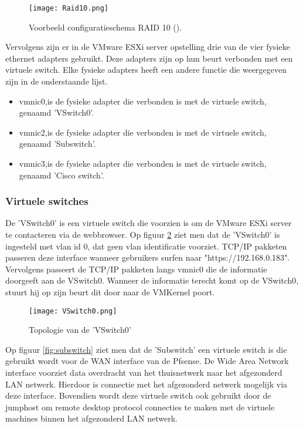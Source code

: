 \begin{figure}[H]
	\centering
	\texttt{[image: Raid10.png]}
	\caption{Voorbeeld configuratieschema RAID 10 (\cite{Raid10}).}
	\label{fig:Raid10}
\end{figure}

Vervolgens zijn er in de VMware ESXi server opstelling drie van de vier fysieke ethernet adapters gebruikt. Deze adapters zijn op hun beurt verbonden met een virtuele switch. Elke fysieke adapters heeft een andere functie die weergegeven zijn in de onderstaande lijst. 


\begin{itemize}
	\item vmnic0,is de fysieke adapter die verbonden is met de virtuele switch, genaamd 'VSwitch0'.
	\item vmnic2,is de fysieke adapter die verbonden is met de virtuele switch, genaamd 'Sub\textunderscore switch'.
	\item vmnic3,is de fysieke adapter die verbonden is met de virtuele switch, genaamd 'Cisco \textunderscore switch'.
\end{itemize}

\newpage
\subsubsection{Virtuele switches}
\newline
De 'VSwitch0' is een virtuele switch die voorzien is om de VMware ESXi server te contacteren via de webbrowser. Op figuur \ref{fig:Vswitch0} ziet men dat de 'VSwitch0' is ingesteld met vlan id 0, dat geen vlan identificatie voorziet. 
\newline
\newline
TCP/IP pakketen passeren deze interface wanneer gebruikers surfen naar "https://192.168.0.183". Vervolgens passeert de TCP/IP pakketen langs vmnic0 die de informatie doorgeeft aan de VSwitch0. Wanneer de informatie terecht komt op de VSwitch0, stuurt hij op zijn beurt dit door naar de VMKernel poort.


\begin{figure}[H]
	\centering
	\texttt{[image: VSwitch0.png]}
	\caption{Topologie van de 'VSwitch0'}
	\label{fig:Vswitch0}
\end{figure}

\newline
Op figuur \ref{fig:subswitch} ziet men dat de 'Sub\textunderscore switch' een virtuele switch is die gebruikt wordt voor de WAN interface van de Pfsense. De Wide Area Network interface voorziet data overdracht van het thuisnetwerk naar het afgezonderd LAN netwerk. Hierdoor is connectie met het afgezonderd netwerk mogelijk via deze interface. Bovendien wordt deze virtuele switch ook gebruikt door de jumphost om remote desktop protocol connecties te maken met de virtuele machines binnen het afgezonderd LAN netwerk. 

